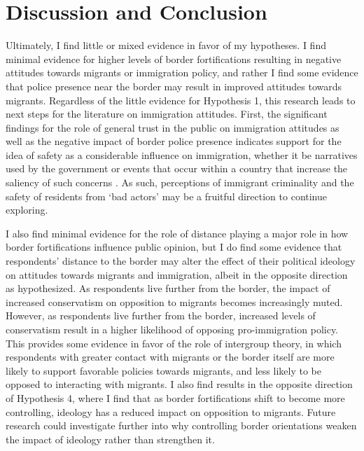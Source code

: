 \documentclass[12pt,]{article}
\begin{document}
\section{Discussion and Conclusion}\label{discussion-and-conclusion}

Ultimately, I find little or mixed evidence in favor of my hypotheses. I
find minimal evidence for higher levels of border fortifications
resulting in negative attitudes towards migrants or immigration policy,
and rather I find some evidence that police presence near the border may
result in improved attitudes towards migrants. Regardless of the little
evidence for Hypothesis 1, this research leads to next steps for the
literature on immigration attitudes. First, the significant findings for
the role of general trust in the public on immigration attitudes as well
as the negative impact of border police presence indicates support for
the idea of safety as a considerable influence on immigration, whether
it be narratives used by the government \citep{bajomi-lazar2019} or
events that occur within a country that increase the saliency of such
concerns \citep{young2018}. As such, perceptions of immigrant
criminality and the safety of residents from `bad actors' may be a
fruitful direction to continue exploring.

I also find minimal evidence for the role of distance playing a major
role in how border fortifications influence public opinion, but I do
find some evidence that respondents' distance to the border may alter
the effect of their political ideology on attitudes towards migrants and
immigration, albeit in the opposite direction as hypothesized. As
respondents live further from the border, the impact of increased
conservatism on opposition to migrants becomes increasingly muted.
However, as respondents live further from the border, increased levels
of conservatism result in a higher likelihood of opposing
pro-immigration policy. This provides some evidence in favor of the role
of intergroup theory, in which respondents with greater contact with
migrants or the border itself are more likely to support favorable
policies towards migrants, and less likely to be opposed to interacting
with migrants. I also find results in the opposite direction of
Hypothesis 4, where I find that as border fortifications shift to become
more controlling, ideology has a reduced impact on opposition to
migrants. Future research could investigate further into why controlling
border orientations weaken the impact of ideology rather than strengthen
it.
\end{document}
